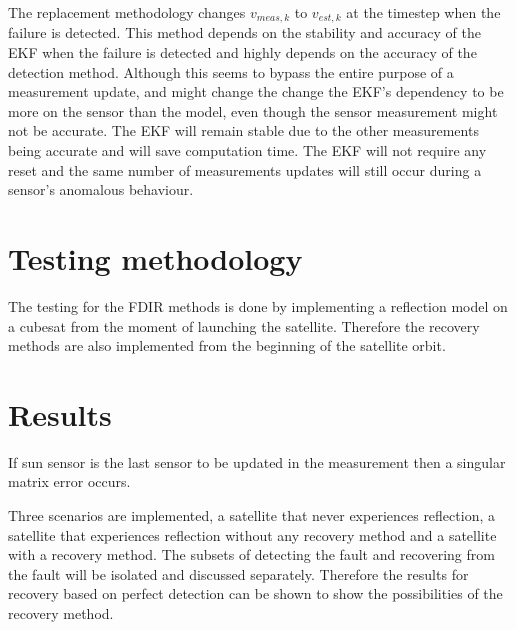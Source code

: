 \documentclass[letterpaper, 10 pt, conference]{ieeeconf}  %
\begin{document}
The replacement methodology changes $v_{meas,k}$ to $v_{est,k}$ at the timestep when the failure is detected. This method depends on the stability and accuracy of the EKF when the failure is detected and highly depends on the accuracy of the detection method. Although this seems to bypass the entire purpose of a measurement update, and might change the change the EKF's dependency to be more on the sensor than the model, even though the sensor measurement might not be accurate. The EKF will remain stable due to the other measurements being accurate and will save computation time. The EKF will not require any reset and the same number of measurements updates will still occur during a sensor's anomalous behaviour.
%
%		
%	

\section{Testing methodology}
The testing for the FDIR methods is done by implementing a reflection model on a cubesat from the moment of launching the satellite. Therefore the recovery methods are also implemented from the beginning of the satellite orbit. 

\section{Results}
\label{section:Results}
If sun sensor is the last sensor to be updated in the measurement then a singular matrix error occurs.

Three scenarios are implemented, a satellite that never experiences reflection, a satellite that experiences reflection without any recovery method and a satellite with a recovery method. The subsets of detecting the fault and recovering from the fault will be isolated and discussed separately. Therefore the results for recovery based on perfect detection can be shown to show the possibilities of the recovery method.
\end{document}
